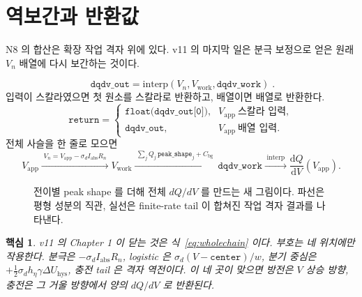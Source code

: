 \documentclass[11pt,a4paper]{article}
\newtheorem*{keybox}{핵심}
\newcommand{\dd}{\mathrm{d}}
\newcommand{\app}{\mathrm{app}}
\newcommand{\bg}{\mathrm{bg}}
\newcommand{\hys}{\mathrm{hys}}
\newcommand{\work}{\mathrm{work}}
\newcommand{\abs}{\mathrm{abs}}
\begin{document}
\section{역보간과 반환값}\label{sec:n9}
N8 의 합산은 확장 작업 격자 위에 있다. v11 의 마지막 일은 분극 보정으로 얻은 원래 $V_n$ 배열에 다시 보간하는 것이다.

\begin{equation}
\boxed{\;\texttt{dqdv\_out}=
\mathrm{interp}(V_n,V_{\work},\texttt{dqdv\_work})\;.}
\label{eq:interp}
\end{equation}
입력이 스칼라였으면 첫 원소를 스칼라로 반환하고, 배열이면 배열로 반환한다.
\begin{equation}
\texttt{return}=
\begin{cases}
\texttt{float(dqdv\_out[0])},&V_{\app}\ \text{스칼라 입력},\\
\texttt{dqdv\_out},&V_{\app}\ \text{배열 입력}.
\end{cases}
\label{eq:return}
\end{equation}
전체 사슬을 한 줄로 모으면
\begin{equation}
V_{\app}
\xrightarrow{\;V_n=V_{\app}-\sigma_d I_{\abs}R_n\;}
V_{\work}
\xrightarrow{\;\sum_j Q_j\,\texttt{peak\_shape}_j+C_{\bg}\;}
\texttt{dqdv\_work}
\xrightarrow{\;\mathrm{interp}\;}
\frac{\dd Q}{\dd V}(V_{\app}).
\label{eq:wholechain}
\end{equation}

\begin{figure}[t]
\centering
{}
\caption{전이별 peak shape 를 더해 전체 $dQ/dV$ 를 만드는 새 그림이다. 파선은 평형 성분의 직관, 실선은 finite-rate tail 이 합쳐진 작업 격자 결과를 나타낸다.}
\label{fig:sum}
\end{figure}

\begin{keybox}
v11 의 Chapter 1 이 닫는 것은 식~\eqref{eq:wholechain} 이다. 부호는 네 위치에만 작용한다. 분극은 $-\sigma_d I_{\abs}R_n$, logistic 은 $\sigma_d(V-\texttt{center})/w$, 분기 중심은 $+\tfrac12\sigma_d h_\eta\gamma\Delta U_{\hys}$, 충전 tail 은 격자 역전이다. 이 네 곳이 맞으면 방전은 $V$ 상승 방향, 충전은 그 거울 방향에서 양의 $dQ/dV$ 로 반환된다.
\end{keybox}
\end{document}
